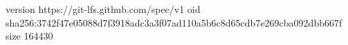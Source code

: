 version https://git-lfs.github.com/spec/v1
oid sha256:3742f47e05088d7f3918adc3a3f07ad110a5b6c8d65cdb7e269cba092dbb667f
size 164430
